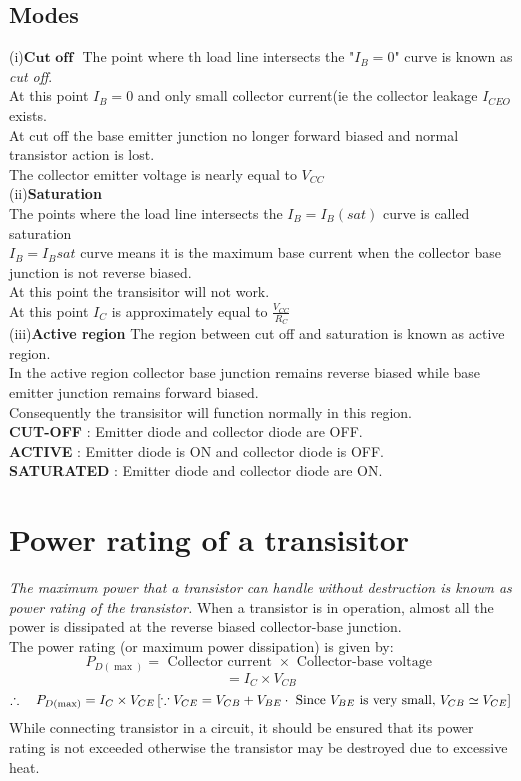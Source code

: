 \subsection{Modes}
(i)$\textbf{Cut off }$
The point where th load line intersects the "$I_B=0$" curve is known as \textit{cut off}.\\
At this point $I_B=0$ and only small collector current(ie the collector leakage $I_{CEO} $ exists.\\
At cut off the base emitter junction no longer forward biased and normal transistor action is lost.\\
The collector emitter voltage is nearly equal to $V_{CC}$\\
(ii)\textbf{Saturation}\\
The points where the load line intersects the $I_B=I_B{(sat)}$ curve is called saturation\\
$I_B=I_B{{sat}}$ curve means it is the maximum base current when the collector base junction is not reverse biased.\\
At this point the transisitor will not work.\\
At this point $I_C $ is approximately equal to $\frac{V_{CC}}{R_C}$\\
(iii)\textbf{Active region}
The region between cut off and saturation is known as active region.\\
In the active region collector base junction remains reverse biased while base emitter junction remains forward biased.\\
Consequently the transisitor will function normally in this region.\\
\textbf{CUT-OFF }: Emitter diode and collector diode are OFF.\\
\textbf{ACTIVE }: Emitter diode is ON and collector diode is OFF.\\
\textbf{SATURATED }: Emitter diode and collector diode are ON.
\section{Power rating of a transisitor}
\textit{The maximum power that a transistor can handle without destruction is known as power rating of the transistor.}
When a transistor is in operation, almost all the power is dissipated at the reverse biased collector-base junction.\\
 The power rating (or maximum power dissipation) is given by:
$$P_{D(\max )} =\text { Collector current } \times \text { Collector-base voltage }$$
$$=I_{C} \times V_{C B}$$
$$\therefore \quad P_{D(\max )} =I_{C} \times V_{C E} \\
\left[\because V_{C E}=V_{C B}+V_{B E} \cdot \text { Since } V_{B E} \text { is very small, } V_{C B} \simeq V_{C E}\right]
$$
While connecting transistor in a circuit, it should be ensured that its power rating is not exceeded otherwise the transistor may be destroyed due to excessive heat.
